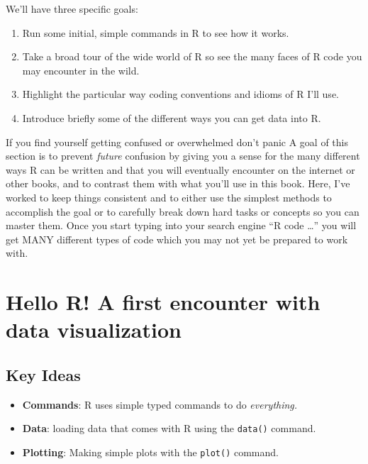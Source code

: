 \documentclass[
]{book}
\providecommand{\tightlist}{%
  \setlength{\itemsep}{0pt}\setlength{\parskip}{0pt}}
\begin{document}
We'll have three specific goals:

\begin{enumerate}
\def\labelenumi{\arabic{enumi}.}
\tightlist
\item
  Run some initial, simple commands in R to see how it works.
\item
  Take a broad tour of the wide world of R so see the many faces of R code you may encounter in the wild.
\item
  Highlight the particular way coding conventions and idioms of R I'll use.
\item
  Introduce briefly some of the different ways you can get data into R.
\end{enumerate}

If you find yourself getting confused or overwhelmed don't panic A goal of this section is to prevent \emph{future} confusion by giving you a sense for the many different ways R can be written and that you will eventually encounter on the internet or other books, and to contrast them with what you'll use in this book. Here, I've worked to keep things consistent and to either use the simplest methods to accomplish the goal or to carefully break down hard tasks or concepts so you can master them. Once you start typing into your search engine ``R code \ldots{}'' you will get MANY different types of code which you may not yet be prepared to work with.

\hypertarget{hello-r-a-first-encounter-with-data-visualization}{%
\chapter{Hello R! A first encounter with data visualization}\label{hello-r-a-first-encounter-with-data-visualization}}

\hypertarget{key-ideas}{%
\section{Key Ideas}\label{key-ideas}}

\begin{itemize}
\tightlist
\item
  \textbf{Commands}: R uses simple typed commands to do \emph{everything.}
\item
  \textbf{Data}: loading data that comes with R using the \texttt{data()} command.
\item
  \textbf{Plotting}: Making simple plots with the \texttt{plot()} command.
\end{itemize}
\end{document}
